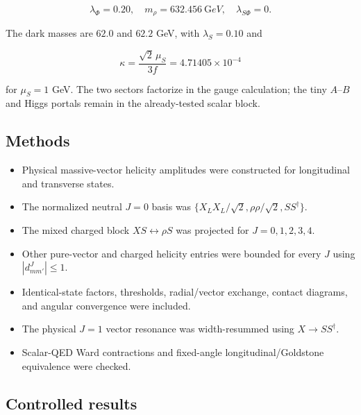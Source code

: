 \documentclass[
]{article}
\providecommand{\tightlist}{%
  \setlength{\itemsep}{0pt}\setlength{\parskip}{0pt}}
\begin{document}
\[
\lambda_\Phi=0.20,\quad m_\rho=632.456\ {\mathrm GeV},\quad \lambda_{S\Phi}=0.
\]

The dark masses are \(62.0\) and \(62.2\) GeV, with \(\lambda_S=0.10\)
and

\[
\kappa=\frac{\sqrt2\,\mu_S}{3f}=4.71405\times10^{-4}
\]

for \(\mu_S=1\) GeV. The two sectors factorize in the gauge calculation;
the tiny \(A\)--\(B\) and Higgs portals remain in the already-tested
scalar block.

\hypertarget{methods}{%
\subsection{Methods}\label{methods}}

\begin{itemize}
\tightlist
\item
  Physical massive-vector helicity amplitudes were constructed for
  longitudinal and transverse states.
\item
  The normalized neutral \(J=0\) basis was
  \(\{X_LX_L/\sqrt2,\rho\rho/\sqrt2,SS^\dagger\}\).
\item
  The mixed charged block \(XS\leftrightarrow\rho S\) was projected for
  \(J=0,1,2,3,4\).
\item
  Other pure-vector and charged helicity entries were bounded for every
  \(J\) using \(|d^J_{mm'}|\le1\).
\item
  Identical-state factors, thresholds, radial/vector exchange, contact
  diagrams, and angular convergence were included.
\item
  The physical \(J=1\) vector resonance was width-resummed using
  \(X\to SS^\dagger\).
\item
  Scalar-QED Ward contractions and fixed-angle longitudinal/Goldstone
  equivalence were checked.
\end{itemize}

\hypertarget{controlled-results}{%
\subsection{Controlled results}\label{controlled-results}}
\end{document}
